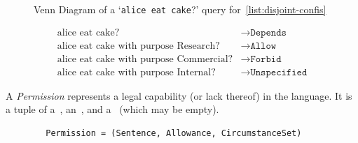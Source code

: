 \begin{figure}[h]

    \centering

    \caption[Venn diagram of query for disjoint circumstances agreement]
    {Venn Diagram of a `\texttt{alice eat cake}?' query for~\autoref{list:disjoint-confis}}
    \label{fig:allowance-venn}
\end{figure}

\begin{align}
    \label{eq:allowance-cake-example}
    \text{alice eat cake?} &\to \texttt{Depends}\\
    \text{alice eat cake with purpose Research?} &\to \texttt{Allow}\\
    \text{alice eat cake with purpose Commercial?} &\to \texttt{Forbid}\\
    \text{alice eat cake with purpose Internal?} &\to \texttt{Unspecified}
\end{align}


\begin{definition}[Permission]
    \label{def:permission} A \emph{Permission} represents a legal capability (or lack thereof) in the language.
    It is a tuple of a~, an~, and a~ (which may be empty).
    \begin{verbatim}
        Permission = (Sentence, Allowance, CircumstanceSet)
    \end{verbatim}
\end{definition}

